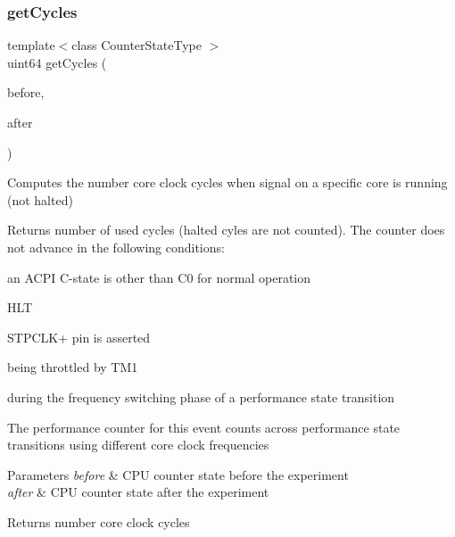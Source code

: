 \subsubsection{\texorpdfstring{get\+Cycles}{getCycles}\hspace{0.1cm}{\footnotesize\ttfamily [1/2]}}
{\footnotesize\ttfamily template$<$class Counter\+State\+Type $>$ \\
uint64 get\+Cycles (\begin{DoxyParamCaption}\item[{const Counter\+State\+Type \&}]{before,  }\item[{const Counter\+State\+Type \&}]{after }\end{DoxyParamCaption})\hspace{0.3cm}{\ttfamily [friend]}}



Computes the number core clock cycles when signal on a specific core is running (not halted) 

Returns number of used cycles (halted cyles are not counted). The counter does not advance in the following conditions\+:
\begin{DoxyItemize}
\item an A\+C\+PI C-\/state is other than C0 for normal operation
\item H\+LT
\item S\+T\+P\+C\+L\+K+ pin is asserted
\item being throttled by T\+M1
\item during the frequency switching phase of a performance state transition
\end{DoxyItemize}

The performance counter for this event counts across performance state transitions using different core clock frequencies


\begin{DoxyParams}{Parameters}
{\em before} & C\+PU counter state before the experiment \\
\hline
{\em after} & C\+PU counter state after the experiment \\
\hline
\end{DoxyParams}
\begin{DoxyReturn}{Returns}
number core clock cycles 
\end{DoxyReturn}
\mbox{\label{class_basic_counter_state_adc17d576ecaf02cf98cebc86329bf2a1}} 
